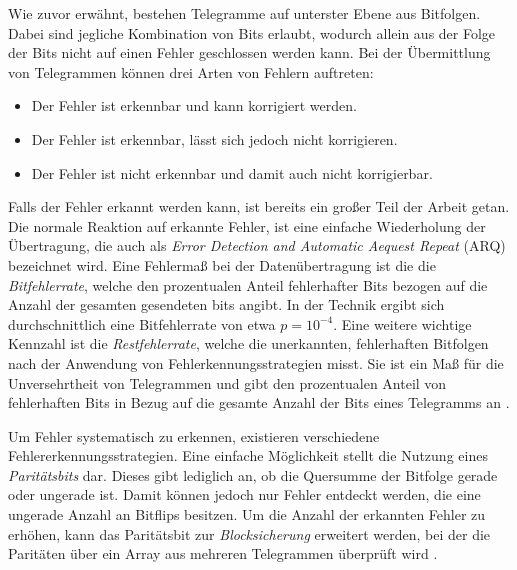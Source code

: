 Wie zuvor erwähnt, bestehen Telegramme auf unterster Ebene aus Bitfolgen. Dabei sind jegliche Kombination von Bits erlaubt, wodurch allein aus der Folge der Bits nicht auf einen Fehler geschlossen werden kann.
Bei der Übermittlung von Telegrammen können drei Arten von Fehlern auftreten:
\begin{itemize}
	\item Der Fehler ist erkennbar und kann korrigiert werden.
	\item Der Fehler ist erkennbar, lässt sich jedoch nicht korrigieren.
	\item Der Fehler ist nicht erkennbar und damit auch nicht korrigierbar.
\end{itemize}
Falls der Fehler erkannt werden kann, ist bereits ein großer Teil der Arbeit getan. Die normale Reaktion auf erkannte Fehler, ist eine einfache Wiederholung der Übertragung, die auch als \textit{Error Detection and Automatic Aequest Repeat} (ARQ) bezeichnet wird.
Eine Fehlermaß bei der Datenübertragung ist die die \textit{Bitfehlerrate}, welche den prozentualen Anteil fehlerhafter Bits bezogen auf die Anzahl der gesamten gesendeten bits angibt. In der Technik ergibt sich durchschnittlich eine Bitfehlerrate von etwa $p=10^{-4}$. 
Eine weitere wichtige Kennzahl ist die \textit{Restfehlerrate}, welche die unerkannten, fehlerhaften Bitfolgen nach der Anwendung von Fehlerkennungsstrategien misst. Sie ist ein Maß für die Unversehrtheit von Telegrammen und gibt den prozentualen Anteil von fehlerhaften Bits in Bezug auf die gesamte Anzahl der Bits eines Telegramms an \cite[S.~31ff.]{schn06}.

Um Fehler systematisch zu erkennen, existieren verschiedene Fehlererkennungsstrategien. Eine einfache Möglichkeit stellt die Nutzung eines \textit{Paritätsbits} dar. Dieses gibt lediglich an, ob die Quersumme der Bitfolge gerade oder ungerade ist. Damit können jedoch nur Fehler entdeckt werden, die eine ungerade Anzahl an Bitflips besitzen. Um die Anzahl der erkannten Fehler zu erhöhen, kann das Paritätsbit zur \textit{Blocksicherung} erweitert werden, bei der die Paritäten über ein Array aus mehreren Telegrammen überprüft wird \cite[S.~34f.]{schn06}.


